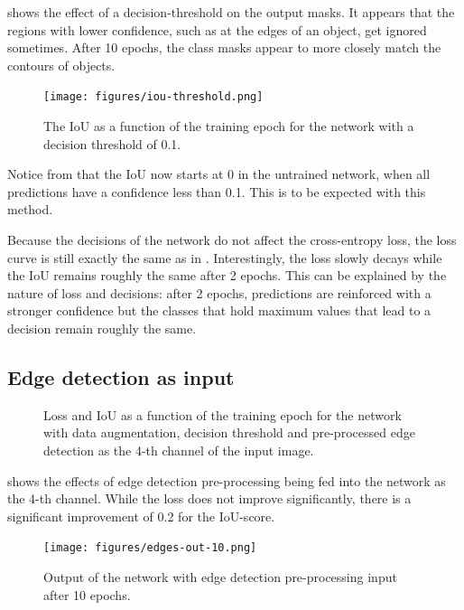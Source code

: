  shows the effect of a decision-threshold on the output masks. It appears that the regions with lower confidence, such as at the edges of an object, get ignored sometimes. After 10 epochs, the class masks appear to more closely match the contours of objects.

\begin{figure}
	\centering
	\texttt{[image: figures/iou-threshold.png]}
	\caption{The IoU as a function of the training epoch for the network with a decision threshold of 0.1.}
	\label{fig:res-iou-thres}
\end{figure}

Notice from  that the IoU now starts at 0 in the untrained network, when all predictions have a confidence less than 0.1. This is to be expected with this method.

Because the decisions of the network do not affect the cross-entropy loss, the loss curve is still exactly the same as in . Interestingly, the loss slowly decays while the IoU remains roughly the same after 2 epochs. This can be explained by the nature of loss and decisions: after 2 epochs, predictions are reinforced with a stronger confidence but the classes that hold maximum values that lead to a decision remain roughly the same.

\subsection{Edge detection as input}
\begin{figure}
	\centering
	\caption{Loss and IoU as a function of the training epoch for the network with data augmentation, decision threshold and pre-processed edge detection as the 4-th channel of the input image.}
	\label{fig:res-edges}
\end{figure}

 shows the effects of edge detection pre-processing being fed into the network as the 4-th channel. While the loss does not improve significantly, there is a significant improvement of 0.2 for the IoU-score. 

\begin{figure}
	\centering
	\texttt{[image: figures/edges-out-10.png]}
	\caption{Output of the network with edge detection pre-processing input after 10 epochs.}
	\label{fig:out-edges}
\end{figure}

